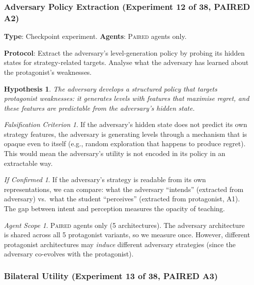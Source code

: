 \documentclass[11pt,a4paper]{article}
\newtheorem{hypothesis}{Hypothesis}[subsection]
\theoremstyle{remark}
\newtheorem*{falsification}{Falsification Criterion}
\newtheorem*{implication}{If Confirmed}
\newtheorem*{agentscope}{Agent Scope}
\newcommand{\paired}{\textsc{Paired}}
\begin{document}
\subsubsection{Adversary Policy Extraction (Experiment 12 of 38, PAIRED A2)}
\label{exp:adversary_policy_extraction}

\textbf{Type}: Checkpoint experiment. \textbf{Agents}: \paired{} agents only.

\textbf{Protocol}: Extract the adversary's level-generation policy by probing its hidden states for strategy-related targets. Analyse what the adversary has learned about the protagonist's weaknesses.

\begin{hypothesis}
The adversary develops a structured policy that targets protagonist weaknesses: it generates levels with features that maximise regret, and these features are predictable from the adversary's hidden state.
\end{hypothesis}

\begin{falsification}
If the adversary's hidden state does not predict its own strategy features, the adversary is generating levels through a mechanism that is opaque even to itself (e.g., random exploration that happens to produce regret). This would mean the adversary's utility is not encoded in its policy in an extractable way.
\end{falsification}

\begin{implication}
If the adversary's strategy is readable from its own representations, we can compare: what the adversary ``intends'' (extracted from adversary) vs.\ what the student ``perceives'' (extracted from protagonist, A1). The gap between intent and perception measures the opacity of teaching.
\end{implication}

\begin{agentscope}
\paired{} agents only (5 architectures). The adversary architecture is shared across all 5 protagonist variants, so we measure once. However, different protagonist architectures may \textit{induce} different adversary strategies (since the adversary co-evolves with the protagonist).
\end{agentscope}

\subsubsection{Bilateral Utility (Experiment 13 of 38, PAIRED A3)}
\label{exp:bilateral_utility}
\end{document}
